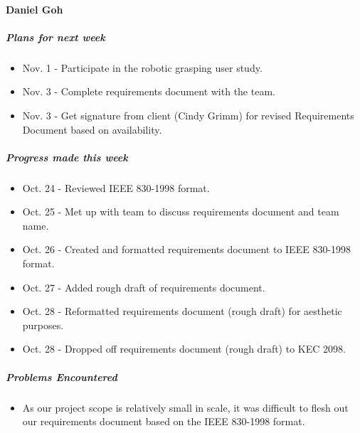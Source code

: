 {\vspace{3mm}

\paragraph{Daniel Goh}
\subparagraph{Plans for next week}
\begin{itemize}
  \item Nov. 1 - Participate in the robotic grasping user study.
  \item Nov. 3 - Complete requirements document with the team.
  \item Nov. 3 - Get signature from client (Cindy Grimm) for revised Requirements Document based on availability.
\end{itemize}

\subparagraph{Progress made this week}
\begin{itemize}
  \item Oct. 24 - Reviewed IEEE 830-1998 format.
  \item Oct. 25 - Met up with team to discuss requirements document and team name.
  \item Oct. 26 - Created and formatted requirements document to IEEE 830-1998 format.
  \item Oct. 27 - Added rough draft of requirements document.
  \item Oct. 28 - Reformatted requirements document (rough draft) for aesthetic purposes.
  \item Oct. 28 - Dropped off requirements document (rough draft) to KEC 2098.
\end{itemize}

\subparagraph{Problems Encountered}
\begin{itemize}
  \item As our project scope is relatively small in scale, it was difficult to flesh out our requirements document based on the IEEE 830-1998 format.
\end{itemize}

}

\newpage

